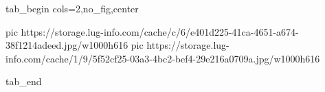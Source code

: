  
 
 
 
 


\ifcmt
  tab_begin cols=2,no_fig,center

     pic https://storage.lug-info.com/cache/c/6/e401d225-41ca-4651-a674-38f1214adeed.jpg/w1000h616%
		 pic https://storage.lug-info.com/cache/1/9/5f52cf25-03a3-4bc2-bef4-29e216a0709a.jpg/w1000h616%

  tab_end
\fi
